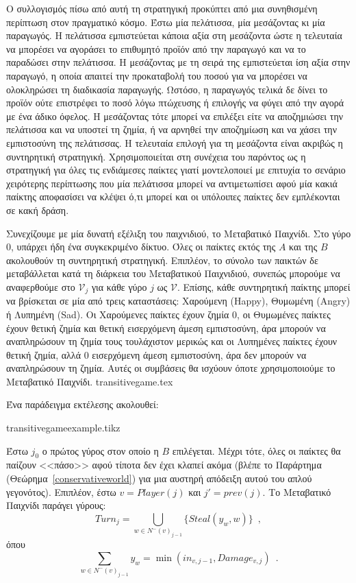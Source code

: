   Ο συλλογισμός πίσω από αυτή τη στρατηγική προκύπτει από μια συνηθισμένη περίπτωση στον πραγματικό κόσμο. Έστω μία πελάτισσα,
  μία μεσάζοντας κι μία παραγωγός. Η πελάτισσα εμπιστεύεται κάποια αξία στη μεσάζοντα ώστε η τελευταία να μπορέσει να
  αγοράσει το επιθυμητό προϊόν από την παραγωγό και να το παραδώσει στην πελάτισσα. Η μεσάζοντας με τη σειρά της εμπιστεύεται ίση
  αξία στην παραγωγό, η οποία απαιτεί την προκαταβολή του ποσού για να μπορέσει να ολοκληρώσει τη διαδικασία παραγωγής.
  Ωστόσο, η παραγωγός τελικά δε δίνει το προϊόν ούτε επιστρέφει το ποσό λόγω πτώχευσης ή επιλογής να φύγει από την αγορά με
  ένα άδικο όφελος. Η μεσάζοντας τότε μπορεί να επιλέξει είτε να αποζημιώσει την πελάτισσα και να υποστεί τη ζημία, ή να αρνηθεί
  την αποζημίωση και να χάσει την εμπιστοσύνη της πελάτισσας. Η τελευταία επιλογή για τη μεσάζοντα είναι ακριβώς η συντηρητική
  στρατηγική. Χρησιμοποιείται στη συνέχεια του παρόντος ως η στρατηγική για όλες τις ενδιάμεσες παίκτες γιατί μοντελοποιεί
  με επιτυχία το σενάριο χειρότερης περίπτωσης που μία πελάτισσα μπορεί να αντιμετωπίσει αφού μία κακιά παίκτης αποφασίσει να
  κλέψει ό,τι μπορεί και οι υπόλοιπες παίκτες δεν εμπλέκονται σε κακή δράση.

  Συνεχίζουμε με μία δυνατή εξέλιξη του παιχνιδιού, το Μεταβατικό Παιχνίδι. Στο γύρο 0, υπάρχει ήδη ένα συγκεκριμένο δίκτυο.
  Όλες οι παίκτες εκτός της $A$ και της $B$ ακολουθούν τη συντηρητική στρατηγική. Επιπλέον, το σύνολο των παικτών δε
  μεταβάλλεται κατά τη διάρκεια του Μεταβατικού Παιχνιδιού, συνεπώς μπορούμε να αναφερθούμε στο $\mathcal{V}_j$ για κάθε γύρο
  $j$ ως $\mathcal{V}$. Επίσης, κάθε συντηρητική παίκτης μπορεί να βρίσκεται σε μία από τρεις καταστάσεις: Χαρούμενη
  (\textlatin{Happy}), Θυμωμένη (\textlatin{Angry}) ή Λυπημένη (\textlatin{Sad}). Οι Χαρούμενες παίκτες έχουν ζημία 0, οι
  Θυμωμένες παίκτες έχουν θετική ζημία και θετική εισερχόμενη άμεση εμπιστοσύνη, άρα μπορούν να αναπληρώσουν τη ζημία τους
  τουλάχιστον μερικώς και οι Λυπημένες παί\-κτες έχουν θετική ζημία, αλλά 0 εισερχόμενη άμεση εμπιστοσύνη, άρα δεν μπορούν να
  αναπληρώσουν τη ζημία. Αυτές οι συμβάσεις θα ισχύουν όποτε χρησιμοποιούμε το Μεταβατικό Παιχνίδι.
  {transitivegame.tex}

  Ένα παράδειγμα εκτέλεσης ακολουθεί:

  {transitivegameexample.tikz}

  Έστω $j_0$ ο πρώτος γύρος στον οποίο η $B$ επιλέγεται. Μέχρι τότε, όλες οι παίκτες θα παίζουν <<πάσο>> αφού τίποτα δεν έχει
  κλαπεί ακόμα (βλέπε το Παράρτημα (Θεώρημα~\ref{conservativeworld}) για μια αυστηρή απόδειξη αυτού του απλού γεγονότος).
  Επιπλέον, έστω $v = Player(j)$ και $j' = prev\left(j\right)$. Το Μεταβατικό Παιχνίδι παράγει γύρους:
  \begin{equation}
     Turn_j = \bigcup\limits_{w \in N^{-}\left(v\right)_{j-1}}\{Steal\left(y_w,w\right)\} \enspace,
  \end{equation}
  όπου
  \begin{equation*}
     \sum\limits_{w \in N^{-}\left(v\right)_{j-1}}y_w = \min\left(in_{v, j-1}, Damage_{v, j}\right) \enspace.
  \end{equation*}
 
